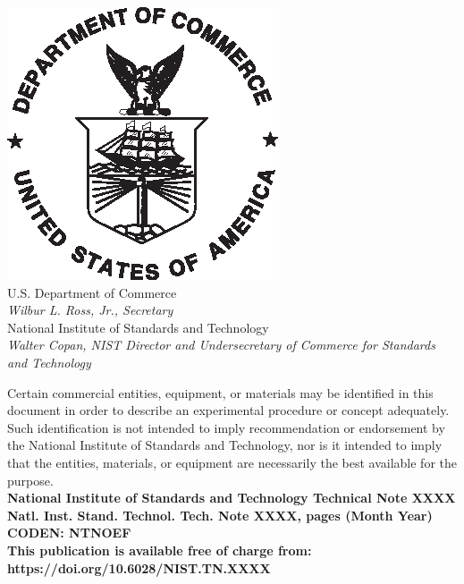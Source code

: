 \documentclass[12pt]{article}
\newcommand{\pubnumber}{XXXX}
\newcommand{\DOI}{https://doi.org/10.6028/NIST.TN.XXXX}
\newcommand{\monthyear}{Month Year}
\begin{document}
\begin{titlepage}
\begin{flushright}
\includegraphics[width=0.18\linewidth]{DoC-logo.eps}\\ 
\vfill
\footnotesize U.S. Department of Commerce\\ 
\textit{Wilbur L. Ross, Jr., Secretary}\\
\vspace{10pt}
National Institute of Standards and Technology\\ 
\textit{Walter Copan, NIST Director and Undersecretary of Commerce for Standards and Technology}  
\end{flushright}
\end{titlepage}

\begin{titlepage}
\begin{flushright}
\footnotesize  Certain commercial entities, equipment, or materials may be identified in this document in order to describe an experimental procedure or concept adequately. Such identification is not intended to imply recommendation or endorsement by the National Institute of Standards and Technology, nor is it intended to imply that the entities, materials, or equipment are necessarily the best available for the purpose.\\ 
\vfill
\normalsize \textbf{National Institute of Standards and Technology Technical Note \pubnumber\\ 
Natl. Inst. Stand. Technol. Tech. Note \pubnumber, \pageref{LastPage} pages (\monthyear)} \\
\textbf{CODEN: NTNOEF}\\
\vspace{12pt}
\textbf{This publication is available free of charge from: \DOI}
\vfill
\end{flushright}
\end{titlepage}
\end{document}
